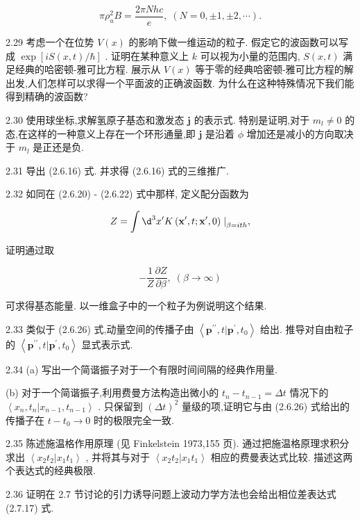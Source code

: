 \documentclass[lang=cn,newtx,10pt,scheme=chinese,thmcnt=section]{elegantbook}
\begin{document}
$$
\pi {\rho }_{u}^{2}B = \frac{2\pi Nhc}{e},\;\left( {N = 0, \pm 1, \pm 2,\cdots }\right) .
$$

2.29 考虑一个在位势 $V\left( x\right)$ 的影响下做一维运动的粒子. 假定它的波函数可以写成 $\exp \left\lbrack {{iS}\left( {x, t}\right) /\hbar }\right\rbrack$ . 证明在某种意义上 $k$ 可以视为小量的范围内, $S\left( {x, t}\right)$ 满足经典的哈密顿-雅可比方程. 展示从 $V\left( x\right)$ 等于零的经典哈密顿-雅可比方程的解出发,人们怎样可以求得一个平面波的正确波函数. 为什么在这种特殊情况下我们能得到精确的波函数?

2.30 使用球坐标,求解氢原子基态和激发态 $\mathbf{j}$ 的表示式. 特别是证明,对于 ${m}_{l} \neq 0$ 的态,在这样的一种意义上存在一个环形通量,即 $\mathbf{j}$ 是沿着 $\phi$ 增加还是减小的方向取决于 ${m}_{l}$ 是正还是负.

2.31 导出 (2.6.16) 式. 并求得 (2.6.16) 式的三维推广.

2.32 如同在 (2.6.20) - (2.6.22) 式中那样, 定义配分函数为

$$
Z = \int {\d}^{3}{x}^{\prime }K\left( {{\mathbf{x}}^{\prime }, t;{\mathbf{x}}^{\prime },0}\right) {\left. \right| }_{\beta = {ith}},
$$

证明通过取

$$
- \frac{1}{Z}\frac{\partial Z}{\partial \beta },\;\left( {\beta \rightarrow \infty }\right)
$$

可求得基态能量. 以一维盒子中的一个粒子为例说明这个结果.

2.33 类似于 (2.6.26) 式,动量空间的传播子由 $\left\langle {{\mathbf{p}}^{\prime \prime }, t | {\mathbf{p}}^{\prime },{t}_{0}}\right\rangle$ 给出. 推导对自由粒子的 $\left\langle {{\mathbf{p}}^{\prime \prime }, t | {\mathbf{p}}^{\prime },{t}_{0}}\right\rangle$ 显式表示式.

2.34 (a) 写出一个简谐振子对于一个有限时间间隔的经典作用量.

(b) 对于一个简谐振子,利用费曼方法构造出微小的 ${t}_{n} - {t}_{n - 1} = {\Delta t}$ 情况下的 $\left\langle {{x}_{n},{t}_{n} | {x}_{n - 1},{t}_{n - 1}}\right\rangle$ . 只保留到 ${\left( \Delta t\right) }^{2}$ 量级的项,证明它与由 (2.6.26) 式给出的传播子在 $t - {t}_{0} \rightarrow 0$ 时的极限完全一致.

2.35 陈述施温格作用原理 (见 Finkelstein 1973,155 页). 通过把施温格原理求积分求出 $\left\langle {{x}_{2}{t}_{2} | {x}_{1}{t}_{1}}\right\rangle$ , 并将其与对于 $\left\langle {{x}_{2}{t}_{2} | {x}_{1}{t}_{1}}\right\rangle$ 相应的费曼表达式比较. 描述这两个表达式的经典极限.

2.36 证明在 2.7 节讨论的引力诱导问题上波动力学方法也会给出相位差表达式 (2.7.17) 式.
\end{document}
